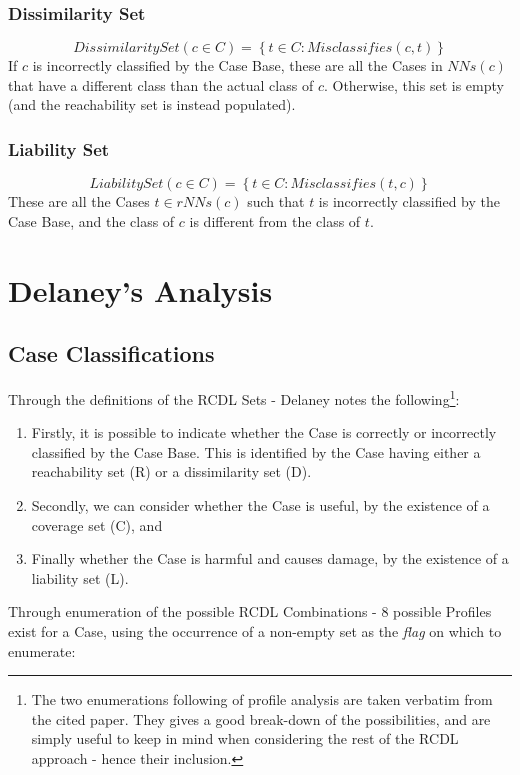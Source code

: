 \documentclass[a4paper,11pt]{report}
\begin{document}
\subsubsection{Dissimilarity Set}
\[ DissimilaritySet(c \in C) = \left\lbrace t \in C : Misclassifies(c, t) \right\rbrace \]  
If $c$ is incorrectly classified by the Case Base, these are all the Cases in $ NNs(c) $ that have a different class than the actual class of $c$. Otherwise, this set is empty (and the reachability set is instead populated).

\subsubsection{Liability Set}
\[ LiabilitySet(c \in C) = \left\lbrace t \in C : Misclassifies(t, c) \right\rbrace \]  
These are all the Cases $ t \in rNNs(c) $ such that $t$ is incorrectly classified by the Case Base, and the class of $c$ is different from the class of $t$.

\section{Delaney's Analysis}

\subsection{Case Classifications}
Through the definitions of the RCDL Sets - Delaney notes the following\citep{Delany2009}\footnote{The two enumerations following of profile analysis are taken verbatim from the cited paper. They gives a good break-down of the possibilities, and are simply useful to keep in mind when considering the rest of the RCDL approach - hence their inclusion.}:

\begin{enumerate}
	\item Firstly, it is possible to indicate whether the Case is correctly or incorrectly classified by the Case Base. This is identified by the Case having either a reachability set (R) or a dissimilarity set (D).
	\item Secondly, we can consider whether the Case is useful, by the existence of a coverage set (C), and
	\item Finally whether the Case is harmful and causes damage, by the existence of a liability set (L).
\end{enumerate}

Through enumeration of the possible RCDL Combinations - 8 possible Profiles exist for a Case, using the occurrence of a non-empty set as the \emph{flag} on which to enumerate\citep{Delany2009}:
\end{document}
